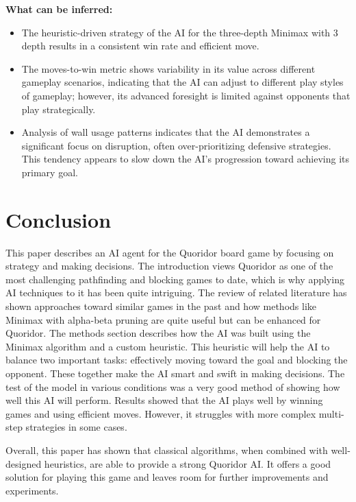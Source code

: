 \documentclass[12pt]{report}
\begin{document}
\textbf{What can be inferred:}

\begin{itemize}
  \item The heuristic-driven strategy of the AI for the three-depth Minimax with 3 depth results in a consistent win rate and efficient move.
  \item The moves-to-win metric shows variability in its value across different gameplay scenarios, indicating that the AI can adjust to different play styles of gameplay; however, its advanced foresight is limited against opponents that play strategically.
  \item Analysis of wall usage patterns indicates that the AI demonstrates a significant focus on disruption, often over-prioritizing defensive strategies. This tendency appears to slow down the AI’s progression toward achieving its primary goal.
\end{itemize}


\newpage

\chapter{Conclusion}

This paper describes an AI agent for the Quoridor board game by focusing on strategy and making decisions. The introduction views Quoridor as one of the most challenging pathfinding and blocking games to date, which is why applying AI techniques to it has been quite intriguing. The review of related literature has shown approaches toward similar games in the past and how methods like Minimax with alpha-beta pruning are quite useful but can be enhanced for Quoridor. The methods section describes how the AI was built using the Minimax algorithm and a custom heuristic. This heuristic will help the AI to balance two important tasks: effectively moving toward the goal and blocking the opponent. These together make the AI smart and swift in making decisions. The test of the model in various conditions was a very good method of showing how well this AI will perform. Results showed that the AI plays well by winning games and using efficient moves. However, it struggles with more complex multi-step strategies in some cases.

Overall, this paper has shown that classical algorithms, when combined with well-designed heuristics, are able to provide a strong Quoridor AI. It offers a good solution for playing this game and leaves room for further improvements and experiments.
\end{document}
